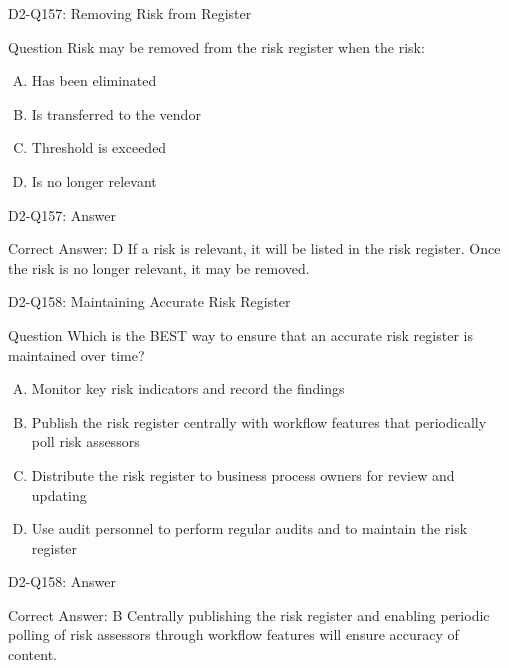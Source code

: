 \documentclass{beamer}
\begin{document}
	\begin{frame}{D2-Q157: Removing Risk from Register}
		\begin{block}{Question}
			Risk may be removed from the risk register when the risk:
		\end{block}
		\begin{enumerate}[(A)]
			\item Has been eliminated
			\item Is transferred to the vendor
			\item Threshold is exceeded
			\item Is no longer relevant
		\end{enumerate}
	\end{frame}
	\begin{frame}{D2-Q157: Answer}
		\begin{block}{Correct Answer: D}
			If a risk is relevant, it will be listed in the risk register. Once the risk is no longer relevant, it may be removed.
		\end{block}
	\end{frame}
	
	\begin{frame}{D2-Q158: Maintaining Accurate Risk Register}
		\begin{block}{Question}
			Which is the BEST way to ensure that an accurate risk register is maintained over time?
		\end{block}
		\begin{enumerate}[(A)]
			\item Monitor key risk indicators and record the findings
			\item Publish the risk register centrally with workflow features that periodically poll risk assessors
			\item Distribute the risk register to business process owners for review and updating
			\item Use audit personnel to perform regular audits and to maintain the risk register
		\end{enumerate}
	\end{frame}
	\begin{frame}{D2-Q158: Answer}
		\begin{block}{Correct Answer: B}
			Centrally publishing the risk register and enabling periodic polling of risk assessors through workflow features will ensure accuracy of content.
		\end{block}
	\end{frame}
	
\end{document}
